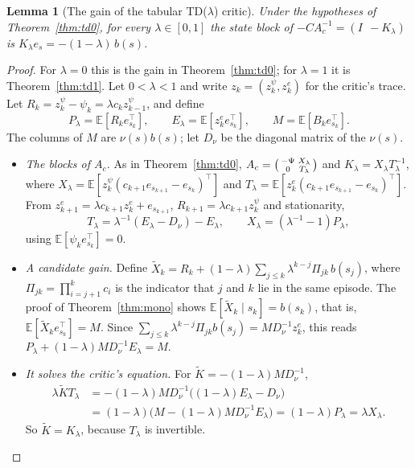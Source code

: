 \documentclass[11pt]{article}
\newtheorem{lemma}[theorem]{Lemma}
\theoremstyle{definition}
\theoremstyle{remark}
\newcommand{\E}{\mathbb{E}}
\begin{document}
\begin{lemma}[The gain of the tabular TD($\lambda$) critic]\label{lem:gain}
Under the hypotheses of Theorem~\ref{thm:td0}, for every $\lambda \in [0,1]$ the state block of
$-CA_c^{-1} = (I\;\, -K_\lambda)$ is $K_\lambda e_s = -(1-\lambda)\,b(s)$.
\end{lemma}
\begin{proof}
For $\lambda = 0$ this is the gain in Theorem~\ref{thm:td0}; for $\lambda = 1$ it is Theorem~\ref{thm:td1}.
Let $0 < \lambda < 1$ and write $z_k = (z^\psi_k, z^e_k)$ for the critic's trace. Let
$R_k = z^\psi_k - \psi_k = \lambda c_kz^\psi_{k-1}$, and define
\[
P_\lambda = \E[R_ke_{s_k}^\top],\qquad E_\lambda = \E[z^e_ke_{s_k}^\top],\qquad M = \E[B_ke_{s_k}^\top].
\]
The columns of $M$ are $\nu(s)b(s)$; let $D_\nu$ be the diagonal matrix of the $\nu(s)$.
\begin{itemize}
\item \emph{The blocks of $A_c$.} As in Theorem~\ref{thm:td0}, $A_c =
  \begin{psmallmatrix}-\Psi & X_\lambda\\ 0 & T_\lambda\end{psmallmatrix}$ and $K_\lambda = X_\lambda T_\lambda^{-1}$, where
  $X_\lambda = \E[z^\psi_k(c_{k+1}e_{s_{k+1}} - e_{s_k})^\top]$ and $T_\lambda = \E[z^e_k(c_{k+1}e_{s_{k+1}} - e_{s_k})^\top]$.
  From $z^e_{k+1} = \lambda c_{k+1}z^e_k + e_{s_{k+1}}$, $R_{k+1} = \lambda c_{k+1}z^\psi_k$ and stationarity,
  \[
    T_\lambda = \lambda^{-1}(E_\lambda - D_\nu) - E_\lambda,\qquad X_\lambda = (\lambda^{-1} - 1)P_\lambda,
  \]
  using $\E[\psi_ke_{s_k}^\top] = 0$.
\item \emph{A candidate gain.} Define
  $\tilde X_k = R_k + (1-\lambda)\sum_{j\le k}\lambda^{k-j}\Pi_{jk}\,b(s_j)$, where $\Pi_{jk} = \prod_{i=j+1}^kc_i$ is
  the indicator that $j$ and $k$ lie in the same episode. The proof of Theorem~\ref{thm:mono} shows
  $\E[\tilde X_k\mid s_k] = b(s_k)$, that is, $\E[\tilde X_ke_{s_k}^\top] = M$. Since
  $\sum_{j\le k}\lambda^{k-j}\Pi_{jk}b(s_j) = MD_\nu^{-1}z^e_k$, this reads
  $P_\lambda + (1-\lambda)MD_\nu^{-1}E_\lambda = M$.
\item \emph{It solves the critic's equation.} For $\tilde K = -(1-\lambda)MD_\nu^{-1}$,
  \begin{align*}
    \lambda\tilde KT_\lambda &= -(1-\lambda)MD_\nu^{-1}\big((1-\lambda)E_\lambda - D_\nu\big)\\
    &= (1-\lambda)\big(M - (1-\lambda)MD_\nu^{-1}E_\lambda\big) = (1-\lambda)P_\lambda = \lambda X_\lambda .
  \end{align*}
  So $\tilde K = K_\lambda$, because $T_\lambda$ is invertible.
\end{itemize}
\end{proof}
\end{document}
